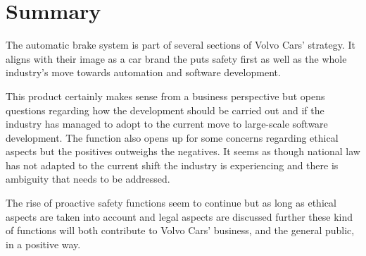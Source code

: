 \documentclass[conference]{IEEEtran}
\begin{document}

\section{Summary}
The automatic brake system is part of several sections of Volvo Cars' strategy. It aligns with their image as a car brand the puts safety first as well as the whole industry's move towards automation and software development.

This product certainly makes sense from a business perspective but opens questions regarding how the development should be carried out and if the industry has managed to adopt to the current move to large-scale software development. The function also opens up for some concerns regarding ethical aspects but the positives outweighs the negatives. It seems as though national law has not adapted to the current shift the industry is experiencing and there is ambiguity that needs to be addressed.

The rise of proactive safety functions seem to continue but as long as ethical aspects are taken into account and legal aspects are discussed further these kind of functions will both contribute to Volvo Cars' business, and the general public, in a positive way.

\end{document}
